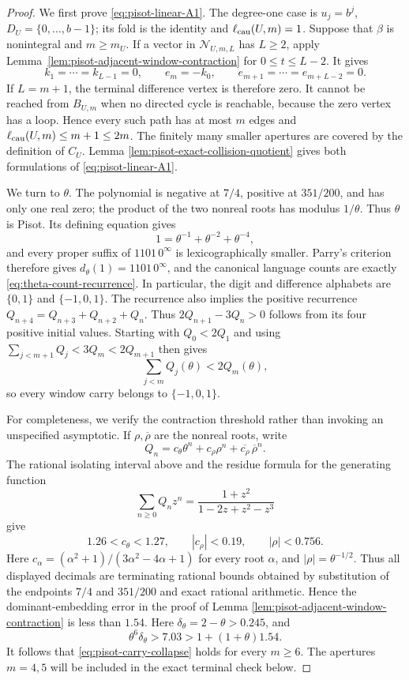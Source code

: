 \begin{proof}
We first prove \eqref{eq:pisot-linear-A1}.  The degree-one case is
$u_j=b^j$, $D_U=\{0,\ldots,b-1\}$; its fold is the identity and
$\ell_{\rm cau}(U,m)=1$.  Suppose that $\beta$ is nonintegral and
$m\ge m_U$.  If a vector in $\mathcal N_{U,m,L}$ has $L\ge2$, apply
Lemma~\ref{lem:pisot-adjacent-window-contraction} for
$0\le t\le L-2$.  It gives
\[
k_1=\cdots=k_{L-1}=0,\qquad
e_m=-k_0,\qquad e_{m+1}=\cdots=e_{m+L-2}=0.
\]
If $L=m+1$, the terminal difference vertex is therefore zero.  It cannot
be reached from $B_{U,m}$ when no directed cycle is reachable, because the
zero vertex has a loop.  Hence every such path has at most $m$ edges and
$\ell_{\rm cau}(U,m)\le m+1\le2m$.  The finitely many smaller apertures are
covered by the definition of $C_U$.  Lemma
\ref{lem:pisot-exact-collision-quotient} gives both formulations of
\eqref{eq:pisot-linear-A1}.

We turn to $\theta$.  The polynomial is negative at $7/4$, positive at
$351/200$, and has only one real zero; the product of the two nonreal roots
has modulus $1/\theta$.  Thus $\theta$ is Pisot.  Its defining equation
gives
\[
1=\theta^{-1}+\theta^{-2}+\theta^{-4},
\]
and every proper suffix of $1101\,0^\infty$ is lexicographically smaller.
Parry's criterion therefore gives $d_\theta(1)=1101\,0^\infty$, and the
canonical language counts are exactly \eqref{eq:theta-count-recurrence}.
In particular, the digit and difference alphabets are $\{0,1\}$ and
$\{-1,0,1\}$.  The recurrence also implies the positive recurrence
$Q_{n+4}=Q_{n+3}+Q_{n+2}+Q_n$.  Thus
$2Q_{n+1}-3Q_n>0$ follows from its four positive initial values.  Starting
with $Q_0<2Q_1$ and using
$\sum_{j<m+1}Q_j<3Q_m<2Q_{m+1}$ then gives
\begin{equation}
\sum_{j<m}Q_j(\theta)<2Q_m(\theta),
\label{eq:theta-carry-one}
\end{equation}
so every window carry belongs to $\{-1,0,1\}$.

For completeness, we verify the contraction threshold rather than invoking
an unspecified asymptotic.  If $\rho,\overline\rho$ are the nonreal roots,
write
\[
Q_n=c_\theta\theta^n+c_\rho\rho^n+\overline{c_\rho}\,\overline\rho^n.
\]
The rational isolating interval above and the residue formula for the
generating function
\[
\sum_{n\ge0}Q_nz^n=\frac{1+z^2}{1-2z+z^2-z^3}
\]
give
\[
1.26<c_\theta<1.27,\qquad |c_\rho|<0.19,\qquad |\rho|<0.756.
\]
Here $c_\alpha=(\alpha^2+1)/(3\alpha^2-4\alpha+1)$ for every root
$\alpha$, and $|\rho|=\theta^{-1/2}$.  Thus all displayed decimals are
terminating rational bounds obtained by substitution of the endpoints
$7/4$ and $351/200$ and exact rational arithmetic.
Hence the dominant-embedding error in the proof of Lemma
\ref{lem:pisot-adjacent-window-contraction} is less than $1.54$.  Here
$\delta_\theta=2-\theta>0.245$, and
\[
\theta^6\delta_\theta>7.03
>1+(1+\theta)1.54.
\]
It follows that \eqref{eq:pisot-carry-collapse} holds for every $m\ge6$.
The apertures $m=4,5$ will be included in the exact terminal check below.


\end{proof}
